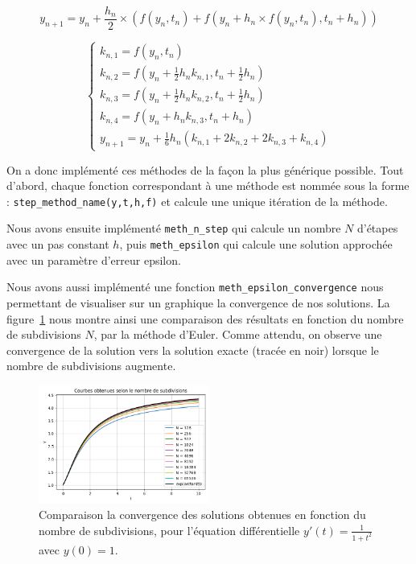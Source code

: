 \begin{equation}
		y_{n+1} = y_n + \frac{h_n}{2} \times (f(y_n, t_n) + f(y_n + h_n \times f(y_n, t_n), t_n + h_n))
	\label{eq:heun}
\end{equation}

\begin{equation}
	\begin{cases}
		k_{n, 1} = f(y_n, t_n)\\
		k_{n, 2} = f(y_n + \frac{1}{2} h_n k_{n, 1}, t_n + \frac{1}{2}h_n)\\
		k_{n, 3} = f(y_n + \frac{1}{2} h_n k_{n, 2}, t_n + \frac{1}{2}h_n)\\
		k_{n, 4} = f(y_n + h_n k_{n, 3}, t_n + h_n)\\
		y_{n+1} = y_n + \frac{1}{6} h_n (k_{n, 1} + 2k_{n, 2} + 2k_{n, 3} + k_{n, 4})
	\end{cases}
	\label{eq:runge-kutta}
\end{equation}

On a donc implémenté ces méthodes de la façon la plus générique possible. Tout d'abord, 
chaque fonction correspondant à une méthode est nommée sous la forme : \texttt{step\_method\_name(y,t,h,f)} et calcule
une unique itération de la méthode.

Nous avons ensuite implémenté \texttt{meth\_n\_step} qui calcule un nombre $N$ d'étapes avec un pas constant $h$,
puis \texttt{meth\_epsilon} qui calcule une solution approchée avec un paramètre d’erreur epsilon.

Nous avons aussi implémenté une fonction \texttt{meth\_epsilon\_convergence} nous permettant de visualiser
sur un graphique la convergence de nos solutions.
La figure~\ref{fig:subdivision} nous montre ainsi une comparaison des résultats en fonction
du nombre de subdivisions $N$, par la méthode d'Euler.
Comme attendu, on observe une convergence de la solution vers la solution exacte (tracée en noir)
lorsque le nombre de subdivisions augmente.

\begin{figure}[htbp!]
	\centering
	\includegraphics[width=0.5\textwidth]{res/subdivisions}
	\caption{Comparaison la convergence des solutions obtenues en fonction du nombre de subdivisions, pour l'équation différentielle $y'(t) = \frac{1}{1 + t^2}$ avec $y(0) = 1$.}
	\label{fig:subdivision}
\end{figure}

